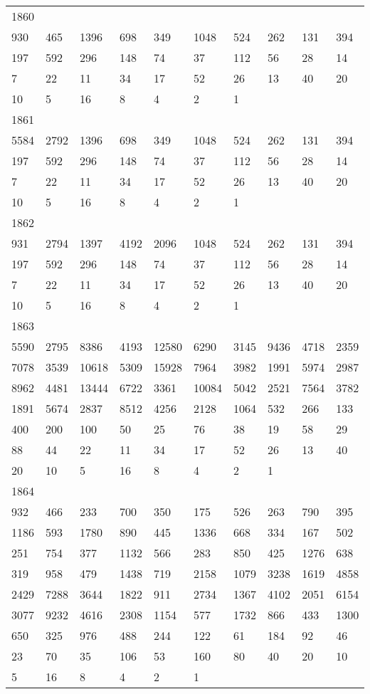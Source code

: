 \begin{longtable}{*{10}{l}}
1860&&&&&&&&&\\
930& 465& 1396& 698& 349& 1048& 524& 262& 131& 394\\
197& 592& 296& 148& 74& 37& 112& 56& 28& 14\\
7& 22& 11& 34& 17& 52& 26& 13& 40& 20\\
10& 5& 16& 8& 4& 2& 1& \\

1861&&&&&&&&&\\
5584& 2792& 1396& 698& 349& 1048& 524& 262& 131& 394\\
197& 592& 296& 148& 74& 37& 112& 56& 28& 14\\
7& 22& 11& 34& 17& 52& 26& 13& 40& 20\\
10& 5& 16& 8& 4& 2& 1& \\

1862&&&&&&&&&\\
931& 2794& 1397& 4192& 2096& 1048& 524& 262& 131& 394\\
197& 592& 296& 148& 74& 37& 112& 56& 28& 14\\
7& 22& 11& 34& 17& 52& 26& 13& 40& 20\\
10& 5& 16& 8& 4& 2& 1& \\

1863&&&&&&&&&\\
5590& 2795& 8386& 4193& 12580& 6290& 3145& 9436& 4718& 2359\\
7078& 3539& 10618& 5309& 15928& 7964& 3982& 1991& 5974& 2987\\
8962& 4481& 13444& 6722& 3361& 10084& 5042& 2521& 7564& 3782\\
1891& 5674& 2837& 8512& 4256& 2128& 1064& 532& 266& 133\\
400& 200& 100& 50& 25& 76& 38& 19& 58& 29\\
88& 44& 22& 11& 34& 17& 52& 26& 13& 40\\
20& 10& 5& 16& 8& 4& 2& 1& \\

1864&&&&&&&&&\\
932& 466& 233& 700& 350& 175& 526& 263& 790& 395\\
1186& 593& 1780& 890& 445& 1336& 668& 334& 167& 502\\
251& 754& 377& 1132& 566& 283& 850& 425& 1276& 638\\
319& 958& 479& 1438& 719& 2158& 1079& 3238& 1619& 4858\\
2429& 7288& 3644& 1822& 911& 2734& 1367& 4102& 2051& 6154\\
3077& 9232& 4616& 2308& 1154& 577& 1732& 866& 433& 1300\\
650& 325& 976& 488& 244& 122& 61& 184& 92& 46\\
23& 70& 35& 106& 53& 160& 80& 40& 20& 10\\
5& 16& 8& 4& 2& 1& \\


\end{longtable}
